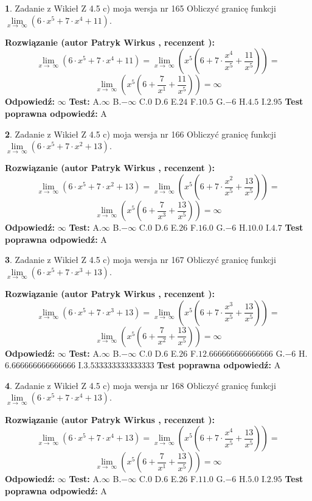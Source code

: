 \documentclass[12pt, a4paper]{article}
\theoremstyle{definition} %
\newtheorem{zad}{}
\newcommand{\zadStart}[1]{\begin{zad}#1\newline}
\newcommand{\zadStop}{\end{zad}}
\newcommand{\rozwStart}[2]{\noindent \textbf{Rozwiązanie (autor #1 , recenzent #2): }\newline}
\newcommand{\rozwStop}{\newline}
\newcommand{\odpStart}{\noindent \textbf{Odpowiedź:}\newline}
\newcommand{\odpStop}{\newline}
\newcommand{\testStart}{\noindent \textbf{Test:}\newline}
\newcommand{\testStop}{\newline}
\newcommand{\kluczStart}{\noindent \textbf{Test poprawna odpowiedź:}\newline}
\newcommand{\kluczStop}{\newline}
\begin{document}
\zadStart{Zadanie z Wikieł Z 4.5 c) moja wersja nr 165}
Obliczyć granicę funkcji  $\lim\limits_{x\to\ \infty}(6 \cdot x^{5}+7 \cdot x^{4}+11)$.
\zadStop
\rozwStart{Patryk Wirkus}{}
$$\lim\limits_{x\to\ \infty}(6 \cdot x^{5}+7 \cdot x^{4}+11) = \lim\limits_{x\to\ \infty}(x^{5}(6 +7 \cdot \frac{x^{4}}{x^{5}}+\frac{11}{x^{5}})) =$$ $$\lim\limits_{x\to\ \infty}(x^{5}(6 +\frac{7}{x^{1}}+\frac{11}{x^{5}})) =\infty$$
\rozwStop
\odpStart
$\infty$
\odpStop
\testStart
A.$\infty$ B.$-\infty$ C.$0$ D.$6$ E.$24$
F.$10.5$ G.$-6$
H.$4.5$
I.$2.95$
\testStop
\kluczStart
A
\kluczStop



\zadStart{Zadanie z Wikieł Z 4.5 c) moja wersja nr 166}
Obliczyć granicę funkcji  $\lim\limits_{x\to\ \infty}(6 \cdot x^{5}+7 \cdot x^{2}+13)$.
\zadStop
\rozwStart{Patryk Wirkus}{}
$$\lim\limits_{x\to\ \infty}(6 \cdot x^{5}+7 \cdot x^{2}+13) = \lim\limits_{x\to\ \infty}(x^{5}(6 +7 \cdot \frac{x^{2}}{x^{5}}+\frac{13}{x^{5}})) =$$ $$\lim\limits_{x\to\ \infty}(x^{5}(6 +\frac{7}{x^{3}}+\frac{13}{x^{5}})) =\infty$$
\rozwStop
\odpStart
$\infty$
\odpStop
\testStart
A.$\infty$ B.$-\infty$ C.$0$ D.$6$ E.$26$
F.$16.0$ G.$-6$
H.$10.0$
I.$4.7$
\testStop
\kluczStart
A
\kluczStop



\zadStart{Zadanie z Wikieł Z 4.5 c) moja wersja nr 167}
Obliczyć granicę funkcji  $\lim\limits_{x\to\ \infty}(6 \cdot x^{5}+7 \cdot x^{3}+13)$.
\zadStop
\rozwStart{Patryk Wirkus}{}
$$\lim\limits_{x\to\ \infty}(6 \cdot x^{5}+7 \cdot x^{3}+13) = \lim\limits_{x\to\ \infty}(x^{5}(6 +7 \cdot \frac{x^{3}}{x^{5}}+\frac{13}{x^{5}})) =$$ $$\lim\limits_{x\to\ \infty}(x^{5}(6 +\frac{7}{x^{2}}+\frac{13}{x^{5}})) =\infty$$
\rozwStop
\odpStart
$\infty$
\odpStop
\testStart
A.$\infty$ B.$-\infty$ C.$0$ D.$6$ E.$26$
F.$12.666666666666666$ G.$-6$
H.$6.666666666666666$
I.$3.533333333333333$
\testStop
\kluczStart
A
\kluczStop



\zadStart{Zadanie z Wikieł Z 4.5 c) moja wersja nr 168}
Obliczyć granicę funkcji  $\lim\limits_{x\to\ \infty}(6 \cdot x^{5}+7 \cdot x^{4}+13)$.
\zadStop
\rozwStart{Patryk Wirkus}{}
$$\lim\limits_{x\to\ \infty}(6 \cdot x^{5}+7 \cdot x^{4}+13) = \lim\limits_{x\to\ \infty}(x^{5}(6 +7 \cdot \frac{x^{4}}{x^{5}}+\frac{13}{x^{5}})) =$$ $$\lim\limits_{x\to\ \infty}(x^{5}(6 +\frac{7}{x^{1}}+\frac{13}{x^{5}})) =\infty$$
\rozwStop
\odpStart
$\infty$
\odpStop
\testStart
A.$\infty$ B.$-\infty$ C.$0$ D.$6$ E.$26$
F.$11.0$ G.$-6$
H.$5.0$
I.$2.95$
\testStop
\kluczStart
A
\kluczStop
\end{document}
